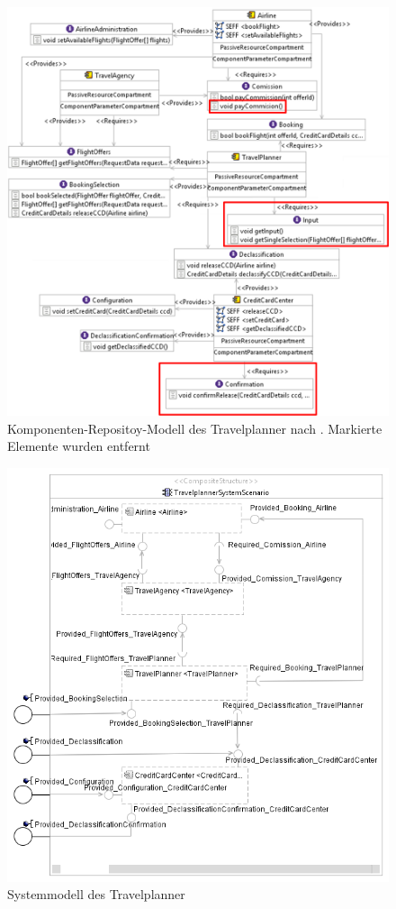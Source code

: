 \begin{figure}[htp]
	\centering
  	\includegraphics[height=0.7\textheight]{images/travelplanner_repository_edit.png}
	\caption{Komponenten-Repositoy-Modell des Travelplanner nach \cite{Kramera}. Markierte Elemente wurden entfernt}
	\label{sec:appendix:travelplanner:old:repo}
\end{figure}

\begin{figure}[htp]
	\centering
  	\includegraphics[height=0.7\textheight]{images/travelplanner_system.png}
	\caption{Systemmodell des Travelplanner}
	\label{sec:appendix:travelplanner:system}
\end{figure}

